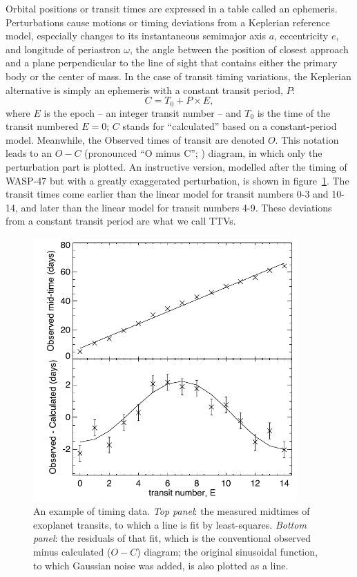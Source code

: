 \documentclass[graybox,natbib,nosecnum]{svmult}
\begin{document}
Orbital positions or transit times are expressed in a table called an ephemeris. Perturbations cause motions or timing deviations from a Keplerian reference model, especially changes to its instantaneous semimajor axis $a$, eccentricity $e$, and longitude of periastron $\omega$, the angle between the position of closest approach and a plane perpendicular to the line of sight that contains either the primary body or the center of mass.  In the case of transit timing variations, the Keplerian alternative is simply an ephemeris with a constant transit period, $P$:
\begin{equation}
C = T_0 + P \times E, 
\end{equation}
where $E$ is the epoch -- an integer transit number -- and $T_0$ is the time of the transit numbered $E=0$; $C$ stands for ``calculated'' based on a constant-period model.  Meanwhile, the Observed times of transit are denoted $O$.  This notation leads to an $O-C$ (pronounced ``O minus C''; \citealt{2005Sterken}) diagram, in which only the perturbation part is plotted.  An instructive version, modelled after the timing of WASP-47 \citep{2015Becker} but with a greatly exaggerated perturbation, is shown in figure~\ref{omc}.  The transit times come earlier than the linear model for transit numbers 0-3 and 10-14, and later than the linear model for transit numbers 4-9.  These deviations from a constant transit period are what we call TTVs.

\begin{figure}
\centerline{
\includegraphics[width=0.9\textwidth]{omc.pdf}}
%
\caption{An example of timing data.  \emph{Top panel}: the measured midtimes of exoplanet transits, to which a line is fit by least-squares.  \emph{Bottom panel}: the residuals of that fit, which is the conventional observed minus calculated ($O-C$) diagram; the original sinusoidal function, to which Gaussian noise was added, is also plotted as a line. }
\label{omc}       %
\end{figure}
\end{document}
